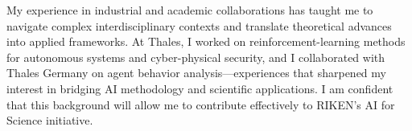 \documentclass[11pt,a4paper,sans]{moderncv}
\begin{document}
My experience in industrial and academic collaborations has taught me to navigate complex interdisciplinary contexts and translate theoretical advances into applied frameworks. At Thales, I worked on reinforcement-learning methods for autonomous systems and cyber-physical security, and I collaborated with Thales Germany on agent behavior analysis---experiences that sharpened my interest in bridging AI methodology and scientific applications. I am confident that this background will allow me to contribute effectively to RIKEN’s AI for Science initiative.

\makeletterclosing
\end{document}
